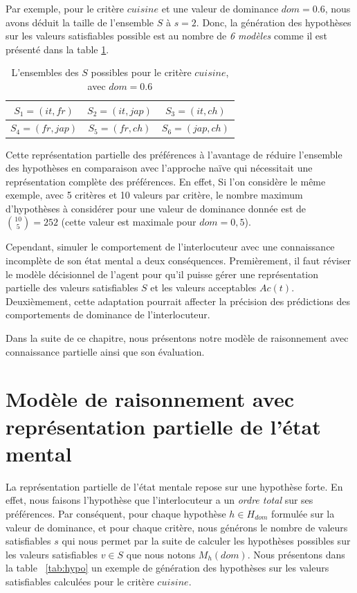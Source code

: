 	Par exemple, pour le critère $cuisine$ et une valeur de dominance $dom =0.6$, nous avons déduit la taille de l'ensemble $S$ à $s=2$. Donc, la génération des hypothèses sur les valeurs satisfiables possible est au nombre de \textit{6 modèles} comme il est présenté dans la table \ref{tab:sat_poss}.
	\begin{table}[h]
		\centering
		\caption{L'ensembles des $S$ possibles pour le critère $cuisine$, avec $dom=0.6$}
		\label{tab:sat_poss}
	
		\begin{tabular}{|c|c|c|}%
			\hline
			$S_1=(it,fr)$& $S_2=(it,jap)$ & $S_3=(it,ch)$\\
			\hline
			$S_4=(fr,jap)$ & $S_5=(fr,ch)$ & $S_6=(jap,ch)$ \\
			\hline
		\end{tabular}
	\end{table}
	
	Cette représentation partielle des préférences à l'avantage de réduire l'ensemble des hypothèses en comparaison avec l'approche naïve qui nécessitait une représentation complète des préférences. En effet, Si l'on considère le même exemple, avec 5 critères et 10 valeurs par critère, le nombre maximum d'hypothèses à considérer pour une valeur de dominance donnée est de $ \binom {10} {5} = 252 $ (cette valeur est maximale pour $ dom = 0,5 $).
	
	Cependant, simuler le comportement de l'interlocuteur avec une connaissance incomplète de son état mental a deux conséquences.
	Premièrement, il faut réviser  le modèle décisionnel de l'agent pour qu'il puisse gérer une représentation partielle des valeurs satisfiables $S$ et les valeurs acceptables $Ac(t)$. Deuxièmement, cette adaptation pourrait affecter la précision des prédictions des comportements de dominance de l'interlocuteur.
	
	Dans la suite de ce chapitre, nous présentons notre modèle de raisonnement avec connaissance partielle ainsi que son évaluation. 
	
	

\section{Modèle de raisonnement avec représentation partielle de l'état mental}
La représentation partielle de l'état mentale repose sur une hypothèse forte. En effet, nous faisons l'hypothèse que l'interlocuteur a un \textit{ordre total} sur ses préférences. Par conséquent, pour chaque hypothèse $h\in H_{dom} $ formulée sur la valeur de dominance, et pour chaque critère, nous générons le nombre de valeurs satisfiables $s$ qui nous permet par la suite de calculer les hypothèses possibles sur les valeurs satisfiables $v\in S$ que nous notons $M_h(dom)$. Nous présentons dans la table ~\ref{tab:hypo} un exemple de génération des hypothèses sur les valeurs satisfiables calculées pour le critère $cuisine$. 

